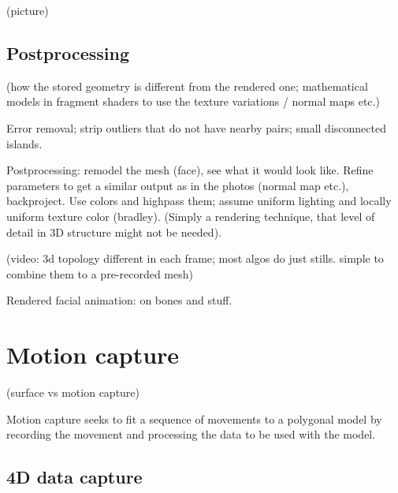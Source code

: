 
(picture)


\subsection{Postprocessing} %

(how the stored geometry is different from the rendered one; mathematical models in fragment shaders to use the texture variations / normal maps etc.)

Error removal; strip outliers that do not have nearby pairs; small disconnected islands.

Postprocessing: remodel the mesh (face), see what it would look like.
Refine parameters to get a similar output as in the photos (normal map etc.), backproject.
Use colors and highpass them; assume uniform lighting and locally uniform texture color (bradley).
(Simply a rendering technique, that level of detail in 3D structure might not be needed).

(video: 3d topology different in each frame; most algos do just stills. simple to combine them to a pre-recorded mesh)

Rendered facial animation: on bones and stuff.

\clearpage
\section{Motion capture}

(surface vs motion capture)

Motion capture seeks to fit a sequence of movements to a polygonal model by recording the movement and processing the data to be used with the model. \cite{find-a-definition-somewhere}



\subsection{4D data capture} %

